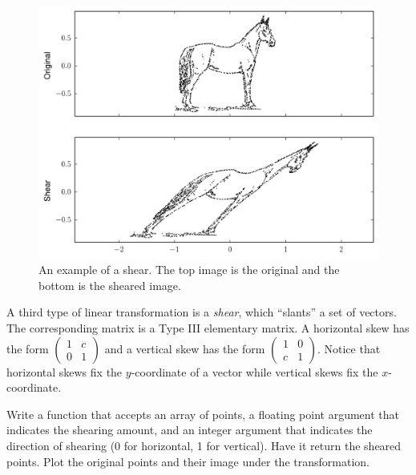 \begin{figure}
\includegraphics[width=\textwidth]{shear.pdf}
\caption{An example of a shear.
The top image is the original and the bottom is the sheared image.}
\label{basis:shear}
\end{figure}

A third type of linear transformation is a \emph{shear}, which ``slants'' a set of vectors. The corresponding matrix is a Type III elementary matrix. A horizontal skew has the form $\begin{pmatrix}
1 & c \\
0 & 1
\end{pmatrix}$ and a vertical skew has the form $
 \begin{pmatrix}
1 & 0 \\
c & 1
\end{pmatrix}
$. Notice that horizontal skews fix the $y$-coordinate of a vector while vertical skews fix the $x$-coordinate.

\begin{problem}
Write a function that accepts an array of points, a floating point argument that indicates the shearing amount, and an integer argument
that indicates the direction of shearing (0 for horizontal, 1 for vertical). Have it return the sheared points.
Plot the original points and their image under the transformation.
\end{problem}

